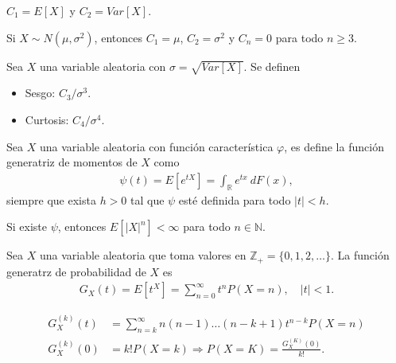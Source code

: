 \begin{obs}
    $C_1 = E[X]$ y $C_2 = Var[X]$.
\end{obs}

\begin{obs}
    Si $X \sim N(\mu, \sigma^2)$, entonces $C_1 = \mu$, $C_2 = \sigma^2$ y $C_n = 0$ para todo $n \ge 3$.
\end{obs}

\begin{defi}
    Sea $X$ una variable aleatoria con $\sigma = \sqrt{Var[X]}$. Se definen
    \begin{itemize}
        \item Sesgo: $C_3 / \sigma^3$.
        \item Curtosis: $C_4 / \sigma^4$.
    \end{itemize}
\end{defi}

\begin{defi}
    Sea $X$ una variable aleatoria con función característica $\varphi$, es define la función generatriz de momentos de $X$ como
    \begin{align*}
        \psi(t) = E \left[ e^{tX} \right] = \int_{\mathbb{R}} e^{tx} \ dF(x),
    \end{align*}
    siempre que exista $h > 0$ tal que $\psi$ esté definida para todo $|t| < h$.
\end{defi}

\begin{obs}
    Si existe $\psi$, entonces $E[|X|^n] < \infty$ para todo $n \in \mathbb{N}$.
\end{obs}

\begin{defi}
    Sea $X$ una variable aleatoria que toma valores en $\mathbb{Z}_+ = \{0,1,2,\ldots\}$. La función generatrz de probabilidad de $X$ es
    \begin{align*}
        G_X(t) = E \left[t^X \right] = \sum_{n=0}^{\infty} t^n P(X = n), \quad |t| < 1.
    \end{align*}
\end{defi}

\begin{obs}
    \begin{align*}
        G_X^{(k)}(t) & = \sum_{n=k}^{\infty} n(n-1) \ldots (n-k+1) t^{n-k}P(X = n)       \\
        G_X^{(k)}(0) & = k! P(X = k) \Longrightarrow P(X = K) = \frac{G_X^{(K)}(0)}{k!}.
    \end{align*}
\end{obs}

